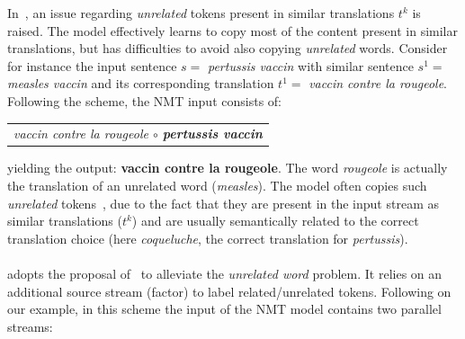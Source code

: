In~\citet{xu20boosting}, an issue regarding {\em unrelated} tokens present in similar translations $t^k$ is raised. The model effectively learns to copy most of the content present in similar translations, but has difficulties to avoid also copying {\em unrelated} words. Consider for instance the input sentence $s=$ {\it pertussis vaccin} with similar sentence $s^1=$ {\it measles vaccin} and its corresponding translation $t^1=$ {\it vaccin contre la rougeole}. Following the  scheme, the NMT input consists of:
\begin{center}
\begin{tabular}{c}
\it vaccin contre la rougeole $\circ$ {\bf pertussis vaccin} \\
\end{tabular}
\end{center}
\noindent yielding the output: {\bf vaccin contre la rougeole}.
%
The word {\it rougeole} is actually the translation of an unrelated word ({\it measles}). The model often copies such {\em unrelated} tokens~\cite{xu20boosting}, due to the fact that they are present in the input stream as similar translations ($t^k$) and are usually semantically related to the correct translation choice (here {\it coqueluche}, the correct translation for {\it pertussis}).

\paragraph{} adopts the proposal of~\citet{xu20boosting} to alleviate the {\em unrelated word} problem. It relies on an additional source stream (factor) to label related/unrelated tokens. Following on our example, in this scheme the input of the NMT model contains two parallel streams:

\begin{center}
\end{center}

